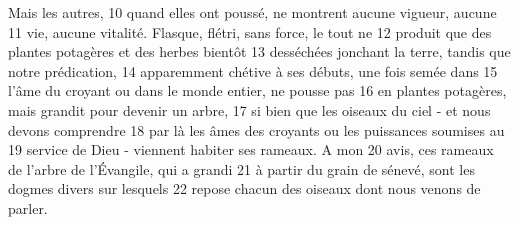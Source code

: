 Mais les autres,	 
10	 	quand elles ont poussé, ne montrent aucune vigueur, aucune	 
11	 	vie, aucune vitalité. Flasque, flétri, sans force, le tout ne	 
12	 	produit que des plantes potagères et des herbes bientôt	 
13	 	desséchées jonchant la terre, tandis que notre prédication,	 
14	 	apparemment chétive à ses débuts, une fois semée dans	 
15	 	l'âme du croyant ou dans le monde entier, ne pousse pas	 
16	 	en plantes potagères, mais grandit pour devenir un arbre,	 
17	 	si bien que les oiseaux du ciel - et nous devons comprendre	 
18	 	par là les âmes des croyants ou les puissances soumises au	 
19	 	service de Dieu - viennent habiter ses rameaux. A mon	 
20	 	avis, ces rameaux de l'arbre de l'Évangile, qui a grandi	 
21	 	à partir du grain de sénevé, sont les dogmes divers sur lesquels	 
22	 	repose chacun des oiseaux dont nous venons de parler.